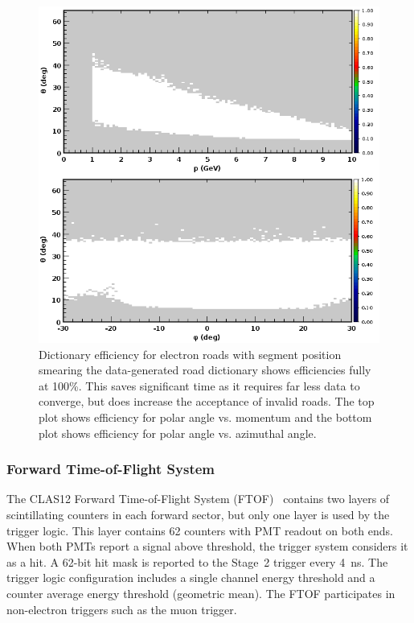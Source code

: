 \begin{figure}[hbt]
	\centering
	\includegraphics[width=1.0\columnwidth,keepaspectratio]{img/dc_neg_data_efficiency_smearing.png}
	\caption{Dictionary efficiency for electron roads with segment position smearing the data-generated road
          dictionary shows efficiencies fully at 100\%. This saves significant time as it requires far less data to
          converge, but does increase the acceptance of invalid roads. The top plot shows efficiency for polar angle
          vs. momentum and the bottom plot shows efficiency for polar angle vs. azimuthal angle.}
	\label{fig:dc_neg_data_efficiency_smearing}
\end{figure}

\subsubsection{Forward Time-of-Flight System}

The CLAS12 Forward Time-of-Flight System (FTOF)~\cite{ftof-ref} contains two layers of scintillating
counters in each forward sector, but only one layer is used by the trigger logic. This layer contains 62 counters
with PMT readout on both ends. When both PMTs report a signal above threshold, the trigger system considers
it as a hit. A 62-bit hit mask is reported to the Stage~2 trigger every 4~ns. The trigger logic configuration
includes a single channel energy threshold and a counter average energy threshold (geometric mean). The FTOF
participates in non-electron triggers such as the muon trigger.

